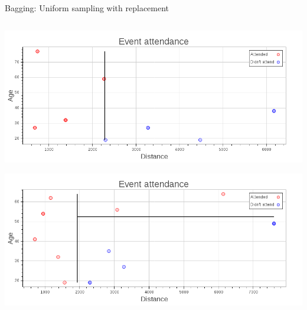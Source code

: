 \begin{frame}[fragile]{Bagging: Uniform sampling with replacement}
    \begin{columns}
     \begin{column}{.49\textwidth}
        \begin{center}
            \includegraphics[scale=.18]{images/bagging1}
        \end{center}
        \newline{}
        \begin{center}
            \includegraphics[scale=.18]{images/bagging2}
        \end{center}
     \end{column}
    

\end{columns}
\end{frame}
